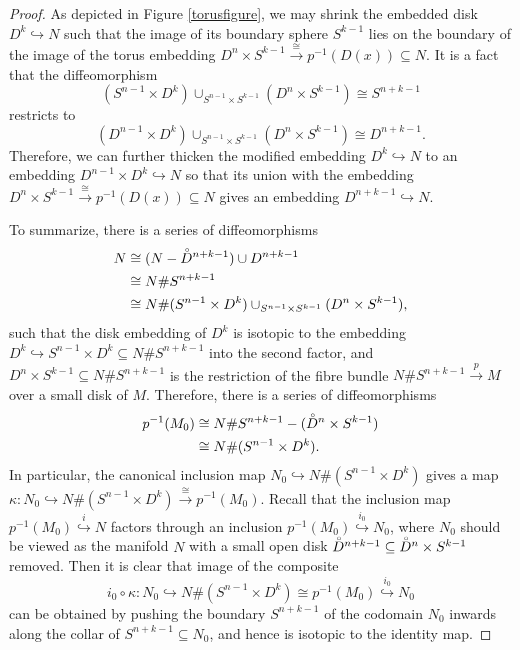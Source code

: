 \documentclass[a4]{amsart}
\theoremstyle{definition}
\begin{document}
\begin{sloppypar}
\begin{proof}
As depicted in Figure \ref{torusfigure}, we may shrink the embedded disk $D^k\hookrightarrow N$ such that the image of its boundary sphere $S^{k-1}$ lies on the boundary of the image of the torus embedding  $D^n\times S^{k-1}\stackrel{\cong}{\longrightarrow} p^{-1}(D(x))\subseteq N$. It is a fact that the diffeomorphism
\[
(S^{n-1}\times D^k)\cup_{S^{n-1}\times S^{k-1}}(D^n\times S^{k-1})\cong S^{n+k-1}
\]
restricts to 
\[
(D^{n-1}\times D^k)\cup_{S^{n-1}\times S^{k-1}}(D^n\times S^{k-1})\cong D^{n+k-1}.
\]
Therefore, we can further thicken the modified embedding $D^k\hookrightarrow N$ to an embedding $D^{n-1}\times D^k \hookrightarrow N$ so that its union with the embedding  $D^n\times  S^{k-1}\stackrel{\cong}{\longrightarrow} p^{-1}(D(x))\subseteq N$ gives an embedding $D^{n+k-1}\stackrel{}{\hookrightarrow} N$. 


To summarize, there is a series of diffeomorphisms 
\[
\begin{split}
N&\cong (N-\accentset{\circ}{D}^{n+k-1})\cup D^{n+k-1}\\
&\cong N\# S^{n+k-1} \\ 
&\cong N\# (S^{n-1}\times D^k)\cup_{S^{n-1}\times S^{k-1}}(D^n\times S^{k-1}),
\end{split}
\] 
such that the disk embedding of $D^k$ is isotopic to the embedding $D^k\stackrel{}{\hookrightarrow}S^{n-1}\times D^k\subseteq N\# S^{n+k-1}$ into the second factor, and $D^n\times S^{k-1}\subseteq N\# S^{n+k-1}$ is the restriction of the fibre bundle $N\# S^{n+k-1}\stackrel{p}{\longrightarrow} M$ over a small disk of $M$. Therefore, there is a series of diffeomorphisms 
\begin{equation}\label{toruseq}
\begin{split}
p^{-1}(M_0)%
& \cong N\# S^{n+k-1} -(\accentset{\circ}{D}^{n}\times S^{k-1})\\
& \cong N\# (S^{n-1}\times D^{k}).
\end{split}
\end{equation}
In particular, the canonical inclusion map $N_0\stackrel{}{\hookrightarrow}N\# (S^{n-1}\times D^{k})$ gives a map $\kappa: N_0\stackrel{}{\hookrightarrow}N\# (S^{n-1}\times D^{k})\stackrel{\cong}{\longrightarrow}p^{-1}(M_0)$. 
Recall that the inclusion map $p^{-1}(M_0)\stackrel{i}{\hookrightarrow} N$ factors through an inclusion $p^{-1}(M_0)\stackrel{i_0}{\hookrightarrow} N_0$, where $N_0$ should be viewed as the manifold $N$ with a small open disk $\accentset{\circ}{D}^{n+k-1}\subseteq \accentset{\circ}{D}^{n}\times S^{k-1}$ removed. Then it is clear that image of the composite
\[
i_0\circ \kappa: N_0\stackrel{}{\hookrightarrow}N\# (S^{n-1}\times D^{k})\cong p^{-1}(M_0)\stackrel{i_0}{\hookrightarrow} N_0
\]
can be obtained by pushing the boundary $S^{n+k-1}$ of the codomain $N_0$ inwards along the collar of $S^{n+k-1}\subseteq N_0$, and hence is isotopic to the identity map. 


\end{proof}
\end{sloppypar}
\end{document}
